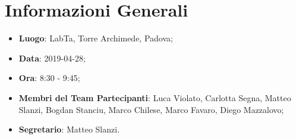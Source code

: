 \section{Informazioni Generali}
\begin{itemize}
	\item \textbf{Luogo}: LabTa, Torre Archimede, Padova; 
	\item \textbf{Data}: 2019-04-28;
	\item \textbf{Ora}: 8:30 - 9:45;
	\item \textbf{Membri del Team Partecipanti}: Luca Violato, Carlotta Segna, Matteo Slanzi, Bogdan Stanciu, Marco Chilese, Marco Favaro, Diego Mazzalovo; 
	\item \textbf{Segretario}: Matteo Slanzi. 
\end{itemize}


